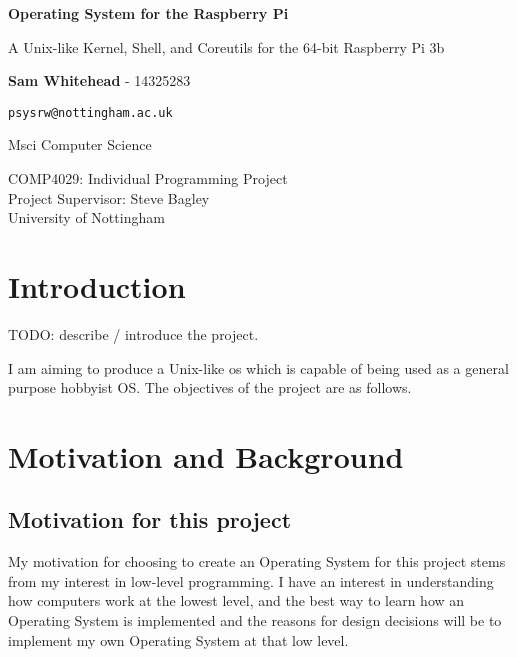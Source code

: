 \documentclass{article}
\begin{document}
\begin{titlepage}
    \begin{center}
        \null\mbox{}\vfill

        \vspace*{1cm}

        \huge
        \textbf{Operating System for the Raspberry Pi}

        \vspace{0.5cm}
        \Large
        A Unix-like Kernel, Shell, and Coreutils for the 64-bit Raspberry Pi 3b

        \Large

        \vspace{1.5cm}

        \textbf{Sam Whitehead} - 14325283

        \texttt{psysrw@nottingham.ac.uk}

        Msci Computer Science

        \vfill

        COMP4029: Individual Programming Project\\
        Project Supervisor: Steve Bagley\\
        University of Nottingham

        \vfill\null
    \end{center}
    \thispagestyle{empty}
\end{titlepage}

\section{Introduction}
TODO: describe / introduce the project.

I am aiming to produce a Unix-like \gls{os} which is capable of being
used as a general purpose hobbyist OS. The objectives of the project are as
follows.


\section{Motivation and Background}
\subsection*{Motivation for this project}
My motivation for choosing to create an Operating System for this project stems
from my interest in low-level programming. I have an interest in understanding
how computers work at the lowest level, and the best way to learn how an
Operating System is implemented and the reasons for design decisions will be to
implement my own Operating System at that low level.
\end{document}
